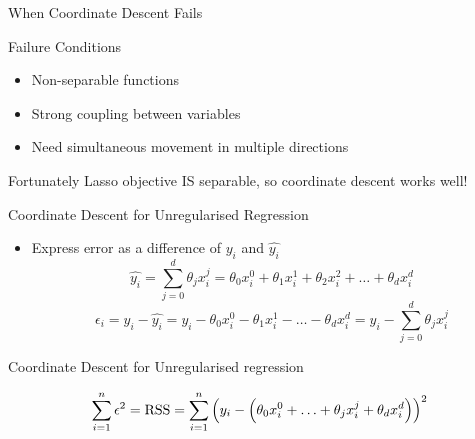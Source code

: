 \documentclass{beamer}
\begin{document}
\begin{frame}{When Coordinate Descent Fails}
\begin{theorembox}{Failure Conditions}
{\small
\begin{itemize}
\item Non-separable functions
\item Strong coupling between variables
\item Need simultaneous movement in multiple directions
\end{itemize}
}
\end{theorembox}

\begin{keypointsbox}{Fortunately}
Lasso objective IS separable, so coordinate descent works well!
\end{keypointsbox}
\end{frame}

\begin{frame}{Coordinate Descent for Unregularised Regression}

\begin{itemize}[<+->]
	
	
	
	
	
	\item Express error as a difference of $y_{i}$ and $\hat{y_{i}}$
	\begin{equation}
	\hat{y_i} = \sum_{j=0}^{d} \theta_{j}x^{j}_{i} = \theta_{0}x_{i}^{0} + \theta_{1}x_{i}^{1} +\theta_{2}x_{i}^{2} + \ldots + \theta_{d}x_{i}^{d}
	\end{equation}
	\begin{equation}
	\epsilon_{i} = y_{i} - \hat{y_{i}} = y_{i} - \theta_{0}x_{i}^{0} - \theta_{1}x_{i}^{1} - \ldots - \theta_{d}x_{i}^{d} = y_{i} - \sum_{j=0}^{d} \theta_{j}x_{i}^{j}
	\end{equation}
	
	
	
\end{itemize}


\end{frame}



\begin{frame}{Coordinate Descent for Unregularised regression}

\[
\sum_{i=1}^{n}  \epsilon^{2}=\operatorname{RSS} =\sum_{i=1}^{n}\left(y_{i}-\left(\theta_{0}x_{i}^{0}+\ldots + \theta_{j} x_{i}^{j}+\theta_{d} x_{i}^{d}\right)\right)^{2}
\]
\end{frame}
\end{document}
